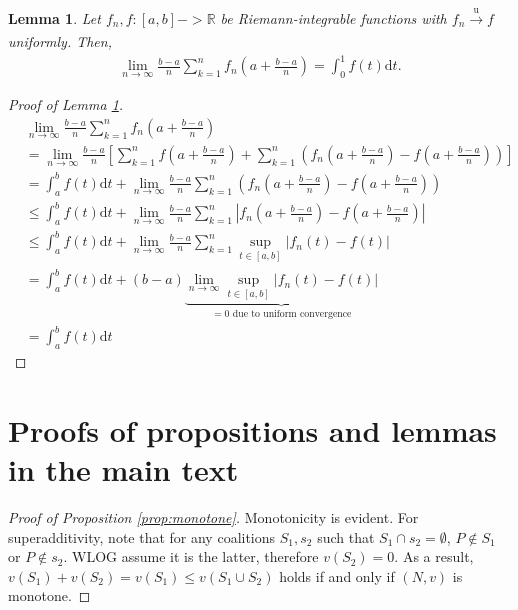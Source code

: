 \documentclass[a4paper]{article}
\newtheorem{lemma}{Lemma}
\newcommand{\dt}{\mathrm{d}t}
\begin{document}
\begin{lemma}
    \label{lemma:integral_convergence}
    Let $f_n, f: [a, b] -> \mathbb{R}$ be Riemann-integrable functions with $f_n \xrightarrow[]{\mathrm{u}} f$ uniformly.
    Then,
    \begin{align*}
        \lim_{n \to \infty} \frac{b-a}{n} \sum_{k=1}^n f_n \left( a + \frac{b-a}{n} \right) = \int_0^1 f(t) \dt.
    \end{align*}
\end{lemma}
\begin{proof}[Proof of Lemma \ref{lemma:integral_convergence}]
    \begin{align*}
        &\lim_{n \to \infty} \frac{b-a}{n} \sum_{k=1}^n f_n \left( a + \frac{b-a}{n} \right) \\
        &= \lim_{n \to \infty} \frac{b-a}{n} \left[ \sum_{k=1}^n f \left( a + \frac{b-a}{n} \right) + \sum_{k=1}^n \left( f_n \left( a + \frac{b-a}{n} \right) - f \left( a + \frac{b-a}{n} \right) \right) \right] \\
        &= \int_a^b f(t) \dt + \lim_{n \to \infty} \frac{b-a}{n}\sum_{k=1}^n \left( f_n \left( a + \frac{b-a}{n} \right) - f \left( a + \frac{b-a}{n} \right) \right) \\
        &\leq \int_a^b f(t) \dt + \lim_{n \to \infty} \frac{b-a}{n}\sum_{k=1}^n \left| f_n \left( a + \frac{b-a}{n} \right) - f \left( a + \frac{b-a}{n} \right) \right| \\
        &\leq \int_a^b f(t) \dt + \lim_{n \to \infty} \frac{b-a}{n}\sum_{k=1}^n \sup_{t \in [a, b]} \left| f_n(t) - f(t) \right| \\
        &= \int_a^b f(t) \dt + (b-a) \underbrace{\lim_{n \to \infty} \sup_{t \in [a, b]} \left| f_n(t) - f(t) \right|}_{=0 \text{ due to uniform convergence}} \\
        &= \int_a^b f(t) \dt
    \end{align*}
\end{proof}


\section{Proofs of propositions and lemmas in the main text}

\begin{proof}[Proof of Proposition \ref{prop:monotone}]
    Monotonicity is evident.
    For superadditivity, note that for any coalitions $S_1, s_2$ such that $S_1 \cap s_2 = \emptyset$, $P \notin S_1$ or $P \notin s_2$.
    WLOG assume it is the latter, therefore $v(S_2) = 0$.
    As a result, $v(S_1) + v(S_2) = v(S_1) \leq v(S_1 \cup S_2)$ holds if and only if $(N, v)$ is monotone.
\end{proof}
\end{document}
